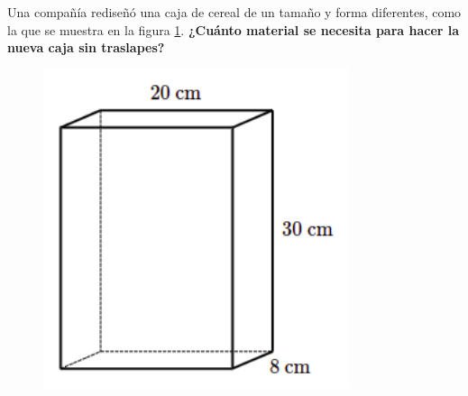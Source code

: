 \question[10] Una compañía rediseñó una caja de cereal de un tamaño y forma diferentes,
como la que se muestra en la figura \ref{fig:prob_verb_superficie_04}.
\textbf{¿Cuánto material se necesita para hacer la nueva caja sin traslapes?}

\begin{minipage}{0.3\linewidth}
    \begin{figure}[H]
        \begin{center}
            \includegraphics[width=0.8\textwidth]{../images/prob_verb_superficie_04}
        \end{center}
        \caption{}
        \label{fig:prob_verb_superficie_04}
    \end{figure}
\end{minipage}
\begin{minipage}{0.7\linewidth}
    \begin{solutionbox}{6cm}
    \end{solutionbox}
\end{minipage}
